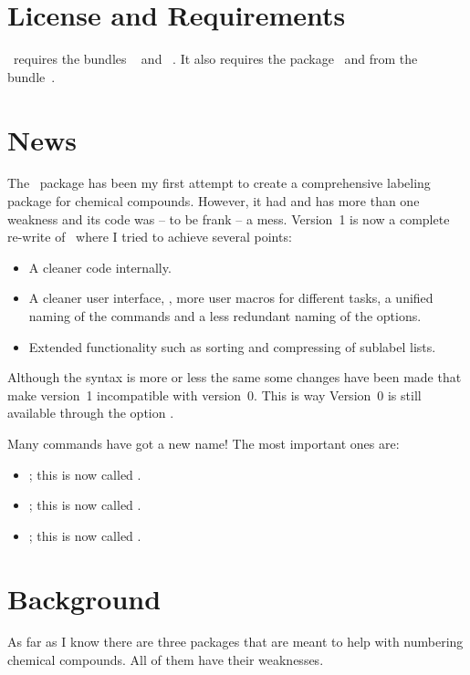 \documentclass[load-preamble+,babel-options={english,american}]{cnltx-doc}
\begin{document}
\section{License and Requirements}\label{sec:license-requirements}
\license

\chemnum\ requires the bundles ~\cite{bnd:l3kernel} and
~\cite{bnd:l3packages}.  It also requires the
 package~\cite{pkg:translations} and  from
the  bundle~\cite{bnd:chemmacros}.

\section{News}\label{sec:news}
The \chemnum\ package has been my first attempt to create a comprehensive
labeling package for chemical compounds.  However, it had and has more than
one weakness and its code was -- to be frank -- a mess.  Version~1 is now a
complete re-write of \chemnum\ where I tried to achieve several points:
\begin{itemize}
  \item A cleaner code internally.
  \item A cleaner user interface, \ie, more user macros for different tasks, a
    unified naming of the commands and a less redundant naming of the
    options.
  \item Extended functionality such as sorting and compressing of sublabel
    lists.
\end{itemize}

Although the syntax is more or less the same some changes have been made that
make version~1 incompatible with version~0.  This is way Version~0 is still
available through the option .

Many commands have got a new name! The most important ones are:
\begin{itemize}
  \item {}; this is now called .
  \item {}; this is now called .
  \item {}; this is now called .
\end{itemize}

\section{Background}\label{sec:background}
As far as I know there are three packages that are meant to help with
numbering chemical compounds.  All of them have their weaknesses.
\end{document}
